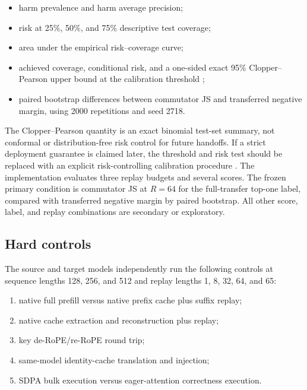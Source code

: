 \documentclass[10pt,twocolumn]{article}
\begin{document}
\begin{itemize}[leftmargin=*,itemsep=2pt]
  \item harm prevalence and harm average precision;
  \item risk at 25\%, 50\%, and 75\% descriptive test coverage;
  \item area under the empirical risk--coverage curve;
  \item achieved coverage, conditional risk, and a one-sided exact 95\%
  Clopper--Pearson upper bound at the calibration threshold
  \citep{clopper1934fiducial};
  \item paired bootstrap differences between commutator JS and transferred
  negative margin, using 2000 repetitions and seed 2718.
\end{itemize}

The Clopper--Pearson quantity is an exact binomial test-set summary, not
conformal or distribution-free risk control for future handoffs.  If a strict
deployment guarantee is claimed later, the threshold and risk test should be
replaced with an explicit risk-controlling calibration procedure
\citep{angelopoulos2024conformal}.  The implementation evaluates three replay
budgets and several scores.  The frozen primary condition is commutator JS at
$R=64$ for the full-transfer top-one label, compared with transferred negative
margin by paired bootstrap.  All other score, label, and replay combinations
are secondary or exploratory.

\subsection{Hard controls}

The source and target models independently run the following controls at
sequence lengths 128, 256, and 512 and replay lengths 1, 8, 32, 64, and 65:

\begin{enumerate}[leftmargin=*,itemsep=2pt]
  \item native full prefill versus native prefix cache plus suffix replay;
  \item native cache extraction and reconstruction plus replay;
  \item key de-RoPE/re-RoPE round trip;
  \item same-model identity-cache translation and injection;
  \item SDPA bulk execution versus eager-attention correctness execution.
\end{enumerate}
\end{document}
